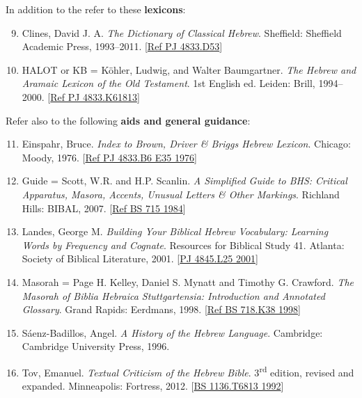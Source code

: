 \documentclass[titlepage]{article}
\begin{document}
In addition to the \cite{bdb} refer to these \textbf{lexicons}:

\begin{enumerate}\setcounter{enumi}{8}
\item
  Clines, David J. A. \emph{The Dictionary of Classical Hebrew}.
  Sheffield: Sheffield Academic Press, 1993--2011.
  [\href{http://tyndale.worldcat.org/oclc/29742583}{Ref PJ 4833.D53}]
\item
  HALOT or KB = Köhler, Ludwig, and Walter Baumgartner. \emph{The Hebrew
  and Aramaic Lexicon of the Old Testament}. 1st English ed. Leiden:
  Brill, 1994--2000.
  [\href{http://tyndale.worldcat.org/oclc/30905049}{Ref PJ 4833.K61813}]
\end{enumerate}

Refer also to the following \textbf{aids and general guidance}:

\begin{enumerate}\setcounter{enumi}{10}
\item
  Einspahr, Bruce. \emph{Index to Brown, Driver \& Briggs Hebrew
  Lexicon}. Chicago: Moody, 1976.
  [\href{http://tyndale.worldcat.org/oclc/3741038}{Ref PJ 4833.B6 E35 1976}]
\item
  Guide = Scott, W.R. and H.P. Scanlin. \emph{A Simplified Guide to BHS:
  Critical Apparatus, Masora, Accents, Unusual Letters \& Other
  Markings}. Richland Hills: BIBAL, 2007.
  [\href{http://tyndale.worldcat.org/oclc/17336542}{Ref BS 715 1984}]
\item
  Landes, George M. \emph{Building Your Biblical Hebrew Vocabulary:
  Learning Words by Frequency and Cognate}. Resources for Biblical Study
  41. Atlanta: Society of Biblical Literature, 2001.
  [\href{http://tyndale.worldcat.org/oclc/45230417}{PJ 4845.L25 2001}]
\item
  Masorah = Page H. Kelley, Daniel S. Mynatt and Timothy G. Crawford.
  \emph{The Masorah of Biblia Hebraica Stuttgartensia: Introduction and
  Annotated Glossary}. Grand Rapids: Eerdmans, 1998.
  [\href{http://tyndale.worldcat.org/oclc/38168226}{Ref BS 718.K38 1998}]
\item
  Sáenz-Badillos, Angel. \emph{A History of the Hebrew Language}.
  Cambridge: Cambridge University Press, 1996.
\item
  Tov, Emanuel. \emph{Textual Criticism of the Hebrew Bible}.
  3\textsuperscript{rd} edition, revised and expanded. Minneapolis:
  Fortress, 2012.
  [\href{http://tyndale.worldcat.org/oclc/26129277}{BS 1136.T6813 1992}]
\end{enumerate}
\end{document}
